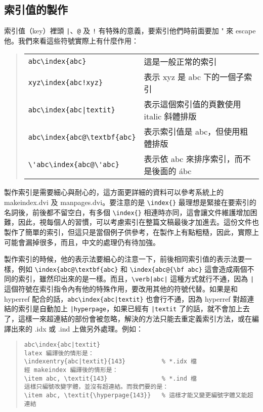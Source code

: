 \subsection{索引值的製作}

索引值（key）裡頭 \verb+|+、\verb|@| 及 \verb|!| 有特殊的意義，要索引他們時前面要加 {\ttfamily "} 來 escape 他。我們來看這些符號實際上有什麼作用：

\begin{quote}
  \begin{tabular}{ll}
    \verb|abc\index{abc}| & 這是一般正常的索引                        \\
    \verb|xyz\index{abc!xyz}| & 表示 xyz 是 abc 下的一個子索引            \\
    \verb+abc\index{abc|textit}+ & 表示這個索引值的頁數使用 italic 斜體排版  \\
    \verb|abc\index{abc@\textbf{abc}| & 表示索引值是 abc，但使用粗體排版          \\
    \verb|\'abc\index{abc@\'abc}| & 表示依 abc 來排序索引，而不是後面的 \'abc
  \end{tabular}
\end{quote}

製作索引是需要細心與耐心的，這方面更詳細的資料可以參考系統上的 {\ttfamily makeindex.dvi} 及 {\ttfamily manpages.dvi}。要注意的是 \verb|\index{}| 最理想是緊接在要索引的名詞後，前後都不留空白，有多個 \verb|\index{}| 相連時亦同，這會讓文件維護增加困難，因此，視每個人的習慣，可以考慮索引在整篇文稿最後才加進去。這份文件也製作了簡單的索引，但這只是當個例子供參考，在製作上有點粗糙，因此，實際上可能會漏掉很多，而且，中文的處理仍有待加強。

製作索引的時候，他的表示法要細心的注意一下，前後相同索引值的表示法要一樣，例如 \verb|\index{abc@\textbf{abc}| 和 \verb|\index{abc@{\bf abc}| 這會造成兩個不同的索引，雖然印出來的是一樣。而且，\verb=\verb|abc|= 這種方式就行不通，因為 \verb=|= 這個符號在索引指令內有他的特殊作用，要改用其他的符號代替。如果是和 {\sffamily hyperref} 配合的話，\verb+abc\index{abc|textit}+ 也會行不通，因為 {\sffamily hyperref} 對超連結的索引是自動加上 \verb=|hyperpage=，如果已經有 \verb=|textit= 了的話，就不會加上去了，這樣一來超連結的部份會被忽略，解決的方法只能去重定義索引方法，或在編譯出來的 {\ttfamily *.idx} 或 {\ttfamily *.ind} 上做另外處理。例如：

\begin{quote}
  \begin{verbatim}
abc\index{abc|textit}
latex 編譯後的情形是：
\indexentry{abc|textit}{143}          % *.idx 檔
經 makeindex 編譯後的情形是：
\item abc, \textit{143}               % *.ind 檔
這樣只編號改變字體，並沒有超連結。而我們要的是：
\item abc, \textit{\hyperpage{143}}   % 這樣才能又變更編號字體又能超連結
\end{verbatim}
\end{quote}


